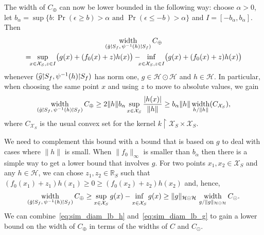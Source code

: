 \documentclass[AHL,Unicode,longabstracts,published]{cedram}
\theoremstyle{remark}
\DeclareMathOperator*{\infd}{inf\vphantom{p}}
\DeclareMathOperator{\diam}{width}
\newcommand{\restrr}
{\!\!\upharpoonright\!\!}
\newcommand{\R}{\mathbb{R}}
\newcommand{\X}{\mathcal{X}}
\newcommand{\cH}{\mathcal{H}}
\newcommand*{\mk}{\mkern -1mu}
\let\oldhat\hat
\renewcommand*{\hat}[1]{\mathchoice{\widehat{#1}}{\widehat{#1}}{\oldhat{#1}}{\oldhat{#1}}}
\let\originalleft\left
\let\originalright\right
\renewcommand{\left}{\mathopen{}\mathclose\bgroup\originalleft}
\renewcommand{\right}{\aftergroup\egroup\originalright}
\begin{document}
The width of $C_{\oplus}$ can now be lower bounded in the following way: choose $\alpha > 0$, let $b_\alpha = \sup\{b : \Pr(\epsilon \geq b) > \alpha \text{ and } \Pr(\epsilon \leq - b) > \alpha \}$ and $I = [-b_\alpha, b_\alpha]$. Then
\begin{multline*}
\diam_{\left(\hat g \mk\upharpoonright\mk S_f,\,\psi^{-1}(h) \mk\upharpoonright\mk S_f\right)} C_{\oplus}\\
=\!\!\! \sup_{x\in\X_S, z \in I } \bigl(g(x) + (f_0(x) + z) h(x)\bigr) -\!\!\! \infd_{x\in \X_S, z \in I}  \bigl(g(x) + (f_0(x) + z)h(x)\bigr)
\end{multline*}
whenever $(\hat g\restrr S_f,\psi^{-1}(h)\restrr S_f)$ has norm one, $g\in \cH\odot \cH$ and $h\in \cH$. In particular, when choosing the same point $x$ and using $z$ to move to absolute values, we gain
\begin{equation}\label{eq:sim_diam_lb_h}
\diam_{\left(\hat g\mk\upharpoonright\mk S_f,\,\psi^{-1}(h)\mk\upharpoonright\mk S_f\right)} C_\oplus \geq 2 \|h\| b_\alpha \sup_{x \in \X_S} \frac{|h(x)|}{\|h\|} \geq b_\alpha \|h\| \diam_{h/\|h\|}(C_{\X_S}),
\end{equation}
where $C_{\X_S}$ is the usual convex set for the kernel $k\restrr \X_S \times \X_S$.

We need to complement this bound with a bound that is based on $g$ to deal with cases where $\|h\|$ is small. When $\|f_0\|_\infty$ is smaller than $b_\alpha$ then there is a simple way to get a lower bound that involves $g$. For two points $x_1,x_2 \in \X_S$ and any $h\in \cH$, we can chose $z_1,z_2 \in \R_S$ such that $(f_0(x_1) + z_1) h(x_1) \geq 0 \geq (f_0(x_2) + z_2) h(x_2)$ and, hence,
\begin{equation}\label{eq:sim_diam_lb_g}
\diam_{\left(\hat g\mk \upharpoonright\mk  S_f,\,\psi^{-1}(h)\mk\upharpoonright\mk S_f\right)} C_\oplus \geq \sup_{x\in \X_S} g(x) - \infd_{x \in \X_S} g(x) \geq \|g\|_{\cH \odot \cH} \, \diam_{g/\|g\|_{\cH\odot \cH}} C_\odot.
\end{equation}
We can combine~\eqref{eq:sim_diam_lb_h} and~\eqref{eq:sim_diam_lb_g} to gain a lower bound on the width of $C_\oplus$ in terms of the widths of $C$ and $C_\odot$.
\end{document}
